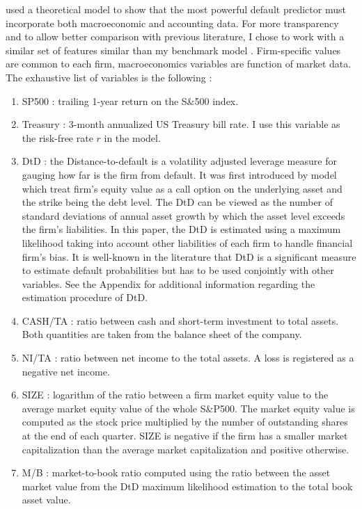 \citet{leippold} used a theoretical model to show that the most powerful default predictor must incorporate both macroeconomic and accounting data. For more transparency and to allow better comparison with previous literature, I chose to work with a similar set of features similar than my benchmark model \citet{Duan2012}. Firm-specific values are common to each firm, macroeconomics variables are function of market data. The exhaustive list of variables is the following :
\begin{enumerate}
\item SP500 : trailing 1-year return on the S\&500 index. 
\item Treasury : 3-month annualized US Treasury bill rate. I use this variable as the risk-free rate $r$ in the model. 
\item DtD : the Distance-to-default is a volatility adjusted leverage measure for gauging how far is the firm from default. It was first introduced by \citet{Merton1974} model which treat firm's equity value as a call option on the underlying asset and the strike being the debt level. The DtD can be viewed as the number of standard deviations of annual asset growth by which the asset level exceeds the firm's liabilities. In this paper, the DtD is estimated using a maximum likelihood taking into account other liabilities of each firm to handle financial firm's bias. It is well-known in the literature that DtD is a significant measure to estimate default probabilities but has to be used conjointly with other variables. See the Appendix for additional information regarding the estimation procedure of DtD.
\item CASH/TA : ratio between cash and short-term investment to total assets. Both quantities are taken from the balance sheet of the company.
\item NI/TA : ratio between net income to the total assets. A loss is registered as a negative net income.
\item SIZE : logarithm of the ratio between a firm market equity value to the average market equity value of the whole S\&P500. The market equity value is computed as the stock price multiplied by the number of outstanding shares at the end of each quarter. SIZE is negative if the firm has a smaller market capitalization than the average market capitalization and positive otherwise.
\item M/B : market-to-book ratio computed using the ratio between the asset market value from the DtD maximum likelihood estimation to the total book asset value.
\end{enumerate}

